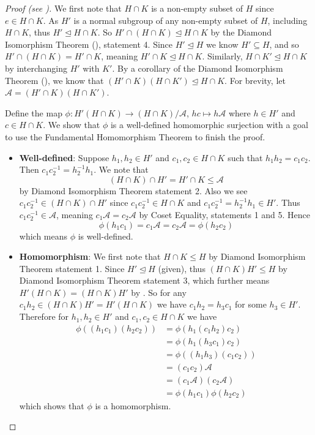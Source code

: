 \begin{proof}[Proof (see {\cite[Lemma I.8.9]{hungerford_1980}})]
    We first note that $H \cap K$ is a non-empty subset of $H$ since $e \in H \cap K$. As $H'$ is a normal subgroup of any non-empty subset of $H$, including $H \cap K$, thus $H' \unlhd H \cap K$. So $H' \cap (H \cap K) \unlhd H \cap K$ by the Diamond Isomorphism Theorem (), statement 4. Since $H'\unlhd H$ we know $H' \subseteq H$, and so $H' \cap (H \cap K) = H' \cap K$, meaning $H' \cap K \unlhd H \cap K$. Similarly, $H \cap K' \unlhd H \cap K$ by interchanging $H'$ with $K'$. By a corollary of the Diamond Isomorphism Theorem (), we know that $(H' \cap K)(H \cap K') \unlhd H \cap K$. For brevity, let $\mathcal{A} = (H' \cap K)(H \cap K')$.

    Define the map $\phi: H'(H\cap K) \to (H\cap K)/\mathcal{A}$, $hc \mapsto h\mathcal{A}$ where $h \in H'$ and $c \in H \cap K$. We show that $\phi$ is a well-defined homomorphic surjection with a goal to use the Fundamental Homomorphism Theorem to finish the proof.

    \begin{itemize}
        \item \textbf{Well-defined}: Suppose $h_1, h_2 \in H'$ and $c_1, c_2 \in H \cap K$ such that $h_1h_2 = c_1c_2$. Then $c_1c_2^{-1} = h_2^{-1}h_1$. We note that
        \[
            (H \cap K) \cap H' = H' \cap K \leq \mathcal{A}
        \]
        by Diamond Isomorphism Theorem statement 2. Also we see $c_1c_2^{-1} \in (H \cap K) \cap H'$ since $c_1c_2^{-1} \in H \cap K$ and $c_1c_2^{-1} = h_2^{-1}h_1 \in H'$. Thus $c_1c_2^{-1} \in \mathcal{A}$, meaning $c_1\mathcal{A} = c_2\mathcal{A}$ by Coset Equality, statements 1 and 5. Hence
        \[
            \phi(h_1c_1) = c_1\mathcal{A} = c_2\mathcal{A} = \phi(h_2c_2)
        \]
        which means $\phi$ is well-defined.

        \item \textbf{Homomorphism}: We first note that $H \cap K \leq H$ by Diamond Isomorphism Theorem statement 1. Since $H' \unlhd H$ (given), thus $(H\cap K)H' \leq H$ by Diamond Isomorphism Theorem statement 3, which further means $H'(H\cap K) = (H\cap K)H'$ by . So for any $c_1h_2 \in (H\cap K)H' = H'(H\cap K)$ we have $c_1h_2 = h_3c_1$ for some $h_3 \in H'$. Therefore for $h_1, h_2 \in H'$ and $c_1, c_2 \in H \cap K$ we have
        \begin{align*}
            \phi((h_1c_1)(h_2c_2)) &= \phi(h_1(c_1h_2)c_2)\\
            &= \phi(h_1(h_3c_1)c_2)\\
            &= \phi((h_1h_3)(c_1c_2))\\
            &= (c_1c_2)\mathcal{A}\\
            &= (c_1\mathcal{A})(c_2\mathcal{A})\\
            &= \phi(h_1c_1)\phi(h_2c_2)
        \end{align*}
        which shows that $\phi$ is a homomorphism.


\end{itemize}
\end{proof}
